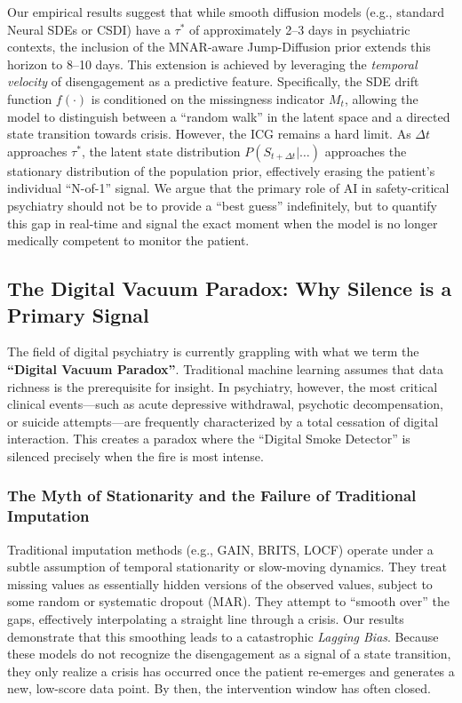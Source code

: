 Our empirical results suggest that while smooth diffusion models (e.g., standard Neural SDEs or CSDI) have a $\tau^*$ of approximately 2--3 days in psychiatric contexts, the inclusion of the MNAR-aware Jump-Diffusion prior extends this horizon to 8--10 days. This extension is achieved by leveraging the \textit{temporal velocity} of disengagement as a predictive feature. Specifically, the SDE drift function $f(\cdot)$ is conditioned on the missingness indicator $M_t$, allowing the model to distinguish between a ``random walk'' in the latent space and a directed state transition towards crisis. However, the ICG remains a hard limit. As $\Delta t$ approaches $\tau^*$, the latent state distribution $P(S_{t+\Delta t} | \dots)$ approaches the stationary distribution of the population prior, effectively erasing the patient's individual ``N-of-1'' signal. We argue that the primary role of AI in safety-critical psychiatry should not be to provide a ``best guess'' indefinitely, but to quantify this gap in real-time and signal the exact moment when the model is no longer medically competent to monitor the patient.

\subsection{The Digital Vacuum Paradox: Why Silence is a Primary Signal}
The field of digital psychiatry is currently grappling with what we term the \textbf{``Digital Vacuum Paradox''}. Traditional machine learning assumes that data richness is the prerequisite for insight. In psychiatry, however, the most critical clinical events—such as acute depressive withdrawal, psychotic decompensation, or suicide attempts—are frequently characterized by a total cessation of digital interaction. This creates a paradox where the ``Digital Smoke Detector'' \cite{nock2026predicting} is silenced precisely when the fire is most intense.

\subsubsection{The Myth of Stationarity and the Failure of Traditional Imputation}
Traditional imputation methods (e.g., GAIN, BRITS, LOCF) operate under a subtle assumption of temporal stationarity or slow-moving dynamics. They treat missing values as essentially hidden versions of the observed values, subject to some random or systematic dropout (MAR). They attempt to ``smooth over'' the gaps, effectively interpolating a straight line through a crisis. Our results demonstrate that this smoothing leads to a catastrophic \textit{Lagging Bias}. Because these models do not recognize the disengagement as a signal of a state transition, they only realize a crisis has occurred once the patient re-emerges and generates a new, low-score data point. By then, the intervention window has often closed.

